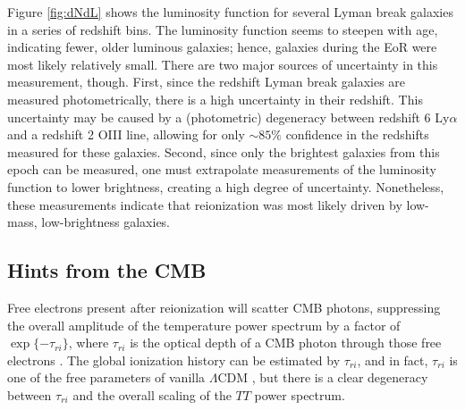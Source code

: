 Figure \ref{fig:dNdL} shows the luminosity function for several Lyman break galaxies in a series of
redshift bins. The luminosity function seems to steepen with age, indicating fewer, older luminous 
galaxies; hence, galaxies during the EoR were most likely relatively small. There are two major sources
of uncertainty in this measurement, though. First, since the redshift Lyman break galaxies are 
measured photometrically, there is a high uncertainty in their redshift. This uncertainty may be
caused by a (photometric) degeneracy between redshift 6 Ly$\alpha$ and a redshift 2 OIII line, allowing for
only $\sim85\%$ confidence in the redshifts measured for these galaxies. Second, since only the
brightest galaxies from this epoch can be measured, one must extrapolate measurements of the
luminosity function to lower brightness, creating a high degree of uncertainty. Nonetheless, these
measurements indicate that reionization was most likely driven by low-mass, low-brightness galaxies. 

\subsection{Hints from the CMB}

Free electrons present after reionization will scatter CMB photons, suppressing the overall
amplitude of the temperature power spectrum by a factor of $\exp\{-\tau_{ri}\}$, where 
$\tau_{ri}$ is the optical depth of a CMB photon through those free electrons 
\cite{Zaldarriaga1997-parameters}. The global ionization history can be estimated by $\tau_{ri}$,
and in fact, $\tau_{ri}$ is one of the free parameters of vanilla $\Lambda$CDM 
\cite[][e.g.]{Spergel2003, Komatsu2009}, but there is a clear degeneracy between $\tau_{ri}$ and the
overall scaling of the $TT$ power spectrum.

